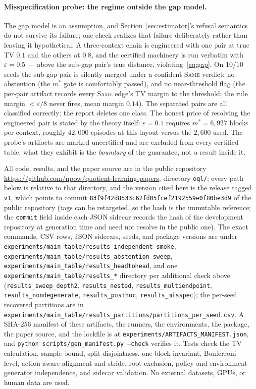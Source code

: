 \documentclass{article}
\newcommand{\eps}{\varepsilon}
\begin{document}
\paragraph{Misspecification probe: the regime outside the gap model.}
The gap model is an assumption, and Section~\ref{sec:estimator}'s refusal
semantics do not survive its failure; one check realizes that failure
deliberately rather than leaving it hypothetical.  A three-context chain is
engineered with one pair at true TV $0.1$ and the others at $0.8$, and the
certified machinery is run verbatim with $\eps=0.5$ --- above the sub-gap
pair's true distance, violating~\eqref{eq:gap}.  On 10/10 seeds the
sub-gap pair is silently merged under a confident \textsc{Same} verdict:
no abstention (the $m^*$ gate is comfortably passed), and no near-threshold
flag (the per-pair artifact records every \textsc{Same} edge's TV margin to
the threshold; the rule margin $<\eps/8$ never fires, mean margin $0.14$).  The separated pairs
are all classified correctly; the report deletes one class.  The honest
price of resolving the engineered pair is stated by the theory itself:
$\eps=0.1$ requires $m^*=6{,}927$ blocks per context, roughly
$42{,}000$ episodes at this layout versus the $2{,}600$ used.  The probe's
artifacts are marked uncertified and are excluded from every certified
table; what they exhibit is the \emph{boundary} of the guarantee, not a
result inside it.

All code, results, and the paper source are in the public repository
\url{https://github.com/npow/quotient-learning-papers}, directory
\texttt{oql/}; every path below is relative to that directory, and the
version cited here is the release tagged \texttt{v1}, which points to
commit \texttt{83f9f42d8533c62fd05fcef2192559e0f80be3d9} of the public
repository (tags can be retargeted, so the hash is the immutable reference; the \texttt{commit} field inside each JSON sidecar records the
hash of the development repository at generation time and need not resolve in
the public one).  The exact commands, CSV rows, JSON sidecars, seeds, and
package versions are under \texttt{experiments/main\_table/results\_independent\_smoke},
\texttt{experiments/main\_table/results\_abstention\_sweep},
\texttt{experiments/main\_table/results\_headtohead}, and one
\texttt{experiments/main\_table/results\_*} directory per additional check
above (\texttt{results\_sweep\_depth2}, \texttt{results\_nested},
\texttt{results\_multiendpoint}, \texttt{results\_nondegenerate},
\texttt{results\_posthoc}, \texttt{results\_misspec}); the per-seed recovered
partitions are in \texttt{experiments/main\_table/results\_partitions/partitions\_per\_seed.csv}.
A SHA-256 manifest of these artifacts, the runners, the environments, the
package, the paper source, and the lockfile is at
\texttt{experiments/ARTIFACTS\_MANIFEST.json}, and
\texttt{python scripts/gen\_manifest.py --check} verifies it.  Tests check the
TV calculation, sample bound, split disjointness, one-block invariant,
Bonferroni level, action-aware alignment and stride, root exclusion, policy
and environment generator independence, and sidecar validation.  No external datasets, GPUs, or human data are used.
\end{document}

